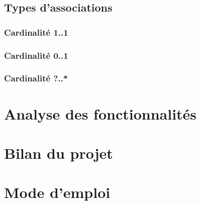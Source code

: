 \documentclass[10pt, a4paper]{article}
\begin{document}
\subsection{Types d'associations}

\subsubsection{Cardinalité 1..1}



\subsubsection{Cardinalité 0..1}



\subsubsection{Cardinalité ?..*}

\section{Analyse des fonctionnalités}
\section{Bilan du projet}
\section{Mode d'emploi}
\end{document}
